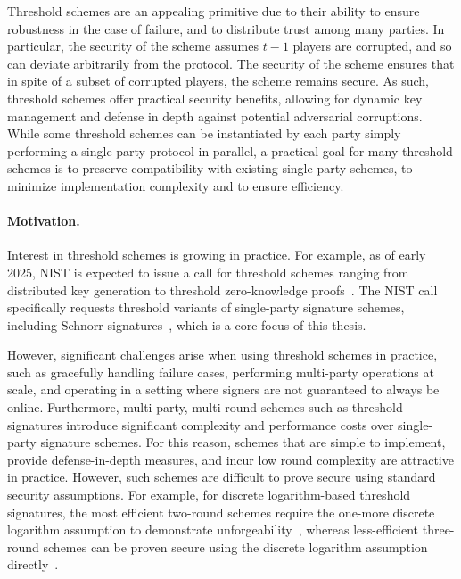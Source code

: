 Threshold schemes are an appealing primitive due to their ability to ensure robustness in the case of failure,
and to distribute trust among many parties.
In particular,
the security of the scheme assumes $t-1$ players are corrupted,
and so can deviate arbitrarily from the protocol.
The security of the scheme ensures that in spite of a subset of corrupted players,
the scheme remains secure.
%
As such,
threshold schemes offer practical security benefits,
allowing for dynamic key management and defense in depth against potential adversarial corruptions.
While some threshold schemes can be instantiated by each party simply performing a single-party protocol in parallel,
a practical goal for many threshold schemes is to preserve compatibility with existing single-party schemes,
to minimize implementation complexity and to ensure efficiency.

\paragraph{Motivation.}
Interest in threshold schemes is growing in practice.
For example,
as of early 2025, NIST is expected to issue a call for threshold schemes ranging from distributed key
generation to threshold zero-knowledge proofs~\cite{NIST22,NIST23}.
The NIST call specifically requests threshold variants of single-party signature schemes,
including Schnorr signatures~\cite{Schnorr91},
which is a core focus of this thesis.

However,
significant challenges arise when using threshold schemes in practice,
such as gracefully handling failure cases,
performing multi-party operations at scale,
and operating in a setting where signers are not guaranteed to always be online.
Furthermore,
multi-party, multi-round schemes such as threshold signatures introduce
significant complexity and performance costs over single-party signature
schemes.
For this reason,
schemes that are simple to implement, provide defense-in-depth measures, and incur low round complexity are attractive in practice.
However, such schemes are difficult to prove secure using standard security assumptions.
For example, for discrete logarithm-based threshold signatures,
the most efficient two-round schemes require the one-more discrete logarithm
assumption to demonstrate unforgeability~\cite{KomloG20,BellareCKMTZ22},
whereas less-efficient three-round schemes can be proven secure using the
discrete logarithm assumption directly~\cite{CritesKM23,BellareCKMTZ22,Lindell22}.

